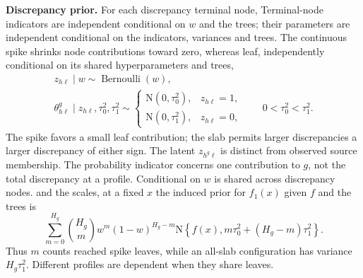 \documentclass[11pt]{article}
\newcommand{\N}{\mathrm{N}}
\theoremstyle{remark}\newtheorem{remark}{Remark}[section]
\providecommand{\DIFaddtex}[1]{{\protect\color{blue} \sf #1}} %
\providecommand{\DIFdeltex}[1]{{\protect\color{red} \scriptsize #1}} %
\providecommand{\DIFaddbegin}{} %
\providecommand{\DIFaddend}{} %
\providecommand{\DIFdelbegin}{} %
\providecommand{\DIFdelend}{} %
\providecommand{\DIFadd}[1]{\texorpdfstring{\DIFaddtex{#1}}{#1}} %
\providecommand{\DIFdel}[1]{\texorpdfstring{\DIFdeltex{#1}}{}} %
\begin{document}
\DIFdelbegin %
\DIFdel{\textbf{Discrepancy prior.}
}\DIFdelend For each discrepancy \DIFdelbegin \DIFdel{terminal node, }%
\DIFdel{Terminal-node indicators are independent conditional on $w$ and the trees; their parameters are independent conditional on the indicators,
variances and trees. The continuous spike shrinks node contributions toward zero, whereas }\DIFdelend \DIFaddbegin \DIFadd{leaf, independently conditional on its shared hyperparameters and trees,
}\begin{equation}\label{eq:mixture}
\begin{gathered}
z_{h\ell}\mid w\sim\operatorname{Bernoulli}(w),\\
\theta^g_{h\ell}\mid z_{h\ell},\tau_0^2,\tau_1^2\sim
\begin{cases}\N(0,\tau_0^2),&z_{h\ell}=1,\\
\N(0,\tau_1^2),&z_{h\ell}=0,
\end{cases}\qquad 0<\tau_0^2<\tau_1^2.
\end{gathered}
\end{equation}
\DIFadd{The spike favors a small leaf contribution; }\DIFaddend the slab permits \DIFdelbegin \DIFdel{larger discrepancies }\DIFdelend \DIFaddbegin \DIFadd{a larger discrepancy }\DIFaddend of either sign. The \DIFdelbegin \DIFdel{latent $z_{h^g\ell}$ is distinct from observed source membership. The probability }\DIFdelend \DIFaddbegin \DIFadd{indicator concerns one contribution to $g$, not the total discrepancy at a profile. Conditional on }\DIFaddend $w$ \DIFdelbegin \DIFdel{is shared across discrepancy nodes. }\DIFdelend \DIFaddbegin \DIFadd{and the scales, at a fixed $x$ the induced prior for $f_1(x)$ given $f$ and the trees is
}\begin{equation}\label{eq:inducedmixture}
\sum_{m=0}^{H_g}\binom{H_g}{m}w^m(1-w)^{H_g-m}
\N\!\left\{f(x),m\tau_0^2+(H_g-m)\tau_1^2\right\}.
\end{equation}
\DIFadd{Thus $m$ counts reached spike leaves, while an all-slab configuration has variance $H_g\tau_1^2$. Different profiles are dependent when they share leaves.
}\DIFaddend 
\end{document}
